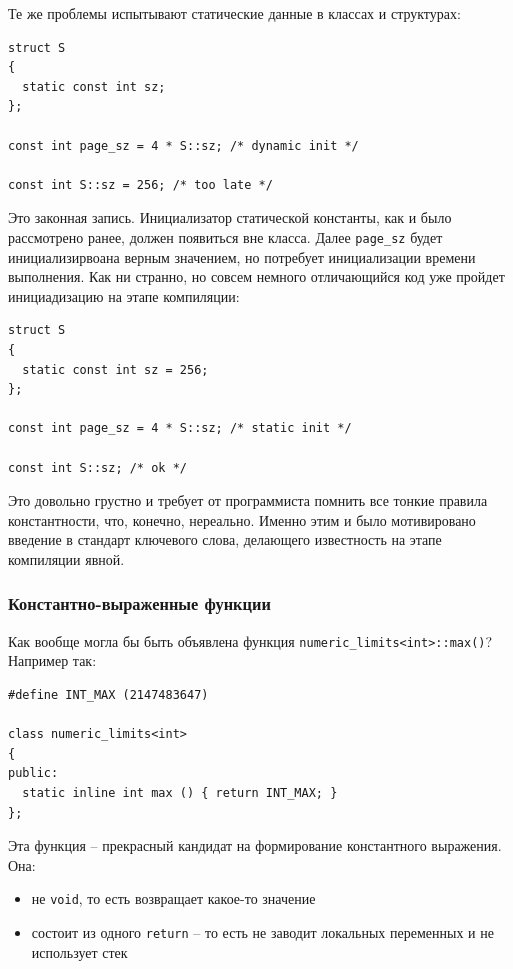 \documentclass[a4paper,12pt,oneside]{article}
\begin{document}
Те же проблемы испытывают статические данные в классах и структурах:

\begin{lstlisting}
struct S 
{
  static const int sz;
};

const int page_sz = 4 * S::sz; /* dynamic init */

const int S::sz = 256; /* too late */
\end{lstlisting}

Это законная запись. Инициализатор статической константы, как и было рассмотрено ранее, должен появиться вне класса. Далее \lstinline!page_sz! будет инициализирвоана верным значением, но потребует инициализации времени выполнения. Как ни странно, но совсем немного отличающийся код уже пройдет инициадизацию на этапе компиляции:

\begin{lstlisting}
struct S 
{
  static const int sz = 256;
};

const int page_sz = 4 * S::sz; /* static init */

const int S::sz; /* ok */
\end{lstlisting}

Это довольно грустно и требует от программиста помнить все тонкие правила константности, что, конечно, нереально. Именно этим и было мотивировано введение в стандарт ключевого слова, делающего известность на этапе компиляции явной.

\subsubsection{Константно-выраженные функции}

Как вообще могла бы быть объявлена функция \lstinline!numeric_limits<int>::max()!? Например так:

\begin{lstlisting}
#define INT_MAX (2147483647)

class numeric_limits<int>
{
public:
  static inline int max () { return INT_MAX; }
};
\end{lstlisting}

Эта функция -- прекрасный кандидат на формирование константного выражения. Она:
\begin{itemize}
\item не \lstinline!void!, то есть возвращает какое-то значение
\item состоит из одного \lstinline!return! -- то есть не заводит локальных переменных и не использует стек
\end{itemize}
\end{document}
